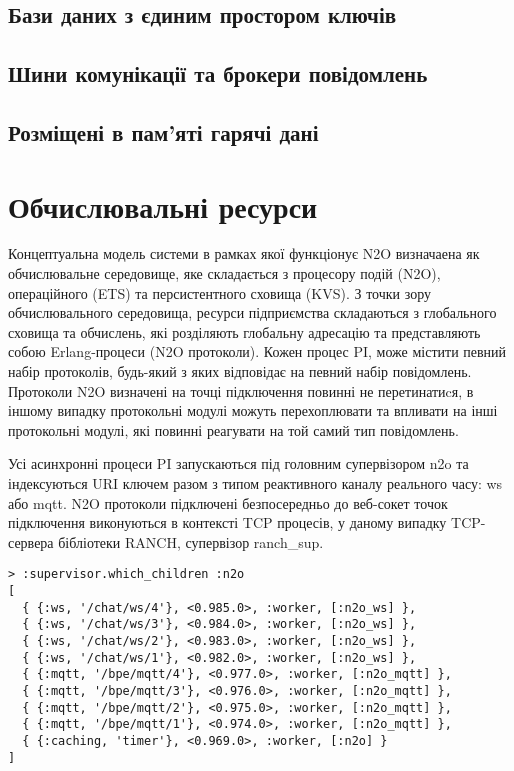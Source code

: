 \subsection{Бази даних з єдиним простором ключів}

\subsection{Шини комунікації та брокери повідомлень}

\subsection{Розміщені в пам'яті гарячі дані}

\newpage
\section{Обчислювальні ресурси}

Концептуальна модель системи в рамках якої функціонує N2O визначаена як обчислювальне середовище,
яке складається з процесору подій (N2O), операційного (ETS) та персистентного сховища (KVS).
З точки зору обчислювального середовища, ресурси підприємства складаються з глобального
 сховища та обчислень, які розділяють глобальну адресацію та представляють собою
Erlang-процеси (N2O протоколи). Кожен процес PI, може містити певний набір протоколів,
будь-який з яких відповідає на певний набір повідомлень. Протоколи N2O визначені на
точці підключення повинні не перетинатиcя, в іншому випадку протокольні модулі можуть
перехоплювати та впливати на інші протокольні модулі, які повинні реагувати на той
самий тип повідомлень.

Усі асинхронні процеси PI запускаються під головним супервізором n2o та індексуються
URI ключем разом з типом реактивного каналу реального часу: ws або mqtt. N2O протоколи
підключені безпосередньо до веб-сокет точок підключення виконуються в контексті TCP
процесів, у даному випадку TCP-сервера бібліотеки RANCH, супервізор ranch\_sup.

\begin{lstlisting}
> :supervisor.which_children :n2o
[
  { {:ws, '/chat/ws/4'}, <0.985.0>, :worker, [:n2o_ws] },
  { {:ws, '/chat/ws/3'}, <0.984.0>, :worker, [:n2o_ws] },
  { {:ws, '/chat/ws/2'}, <0.983.0>, :worker, [:n2o_ws] },
  { {:ws, '/chat/ws/1'}, <0.982.0>, :worker, [:n2o_ws] },
  { {:mqtt, '/bpe/mqtt/4'}, <0.977.0>, :worker, [:n2o_mqtt] },
  { {:mqtt, '/bpe/mqtt/3'}, <0.976.0>, :worker, [:n2o_mqtt] },
  { {:mqtt, '/bpe/mqtt/2'}, <0.975.0>, :worker, [:n2o_mqtt] },
  { {:mqtt, '/bpe/mqtt/1'}, <0.974.0>, :worker, [:n2o_mqtt] },
  { {:caching, 'timer'}, <0.969.0>, :worker, [:n2o] }
]
\end{lstlisting}

